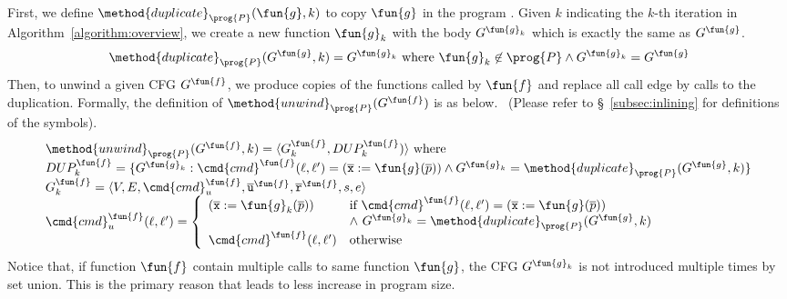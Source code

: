 
First, we define $\method{duplicate}_\prog{P}(\fun{g}, k)$ to copy $\fun{g}$ in
the program .
Given $k$ indicating the $k$-th iteration in Algorithm~\ref{algorithm:overview},
we create a new function $\fun{g}_k$ with the body $G^{\fun{g}_k}$ which is
exactly the same as $G^\fun{g}$.
\[
  \method{duplicate}_\prog{P}(G^\fun{g}, k)
    = G^{\fun{g}_k} \text{ where } \fun{g}_k \not\in \prog{P} \land G^{\fun{g}_k}=G^\fun{g}
\]
Then, to unwind a given CFG $G^\fun{f}$, we produce copies of the functions
called by $\fun{f}$ and replace all call edge by calls to the duplication.
Formally, the definition of $\method{unwind}_\prog{P}(G^\fun{f})$ is as below.
~(Please refer to \S~\ref{subsec:inlining} for definitions of the symbols).
\[
\begin{array}{l}
\method{unwind}_\prog{P}(G^\fun{f}, k)
  = \langle G^\fun{f}_k, DUP^\fun{f}_k) \rangle \text{ where} \\
DUP^\fun{f}_k = \{G^{\fun{g}_k} :
    \cmd{cmd}^\fun{f}(\ell,\ell')=(\overline{\texttt{x}}:=\fun{g}(\overline{p}))
    \land G^{\fun{g}_k} = \method{duplicate}_\prog{P}(G^\fun{g}, k)
  \}\\
G^\fun{f}_k = \langle V, E,\cmd{cmd}_u^\fun{f}, \overline{\texttt{u}}^\fun{f},
      \overline{\texttt{r}}^\fun{f},s,e \rangle \\
{%
\cmd{cmd}_u^\fun{f} (\ell, \ell') =
\left\{
  \begin{array}{ll}
  (\overline{\texttt{x}}:=\fun{g}_k(\overline{p})) &\text{if } 
    \cmd{cmd}^\fun{f}(\ell,\ell')=(\overline{\texttt{x}}:=\fun{g}(\overline{p})) \\
    & \land\ G^{\fun{g}_k} = \method{duplicate}_\prog{P}(G^\fun{g}, k)\\
  \cmd{cmd}^\fun{f}(\ell,\ell') &\text{otherwise}
  \end{array}
\right.
}
\end{array}
\]
Notice that, if function $\fun{f}$ contain multiple calls to same function
$\fun{g}$,
the CFG $G^{\fun{g}_k}$ is not introduced multiple times by set union.
This is the primary reason that leads to less increase in program size.

